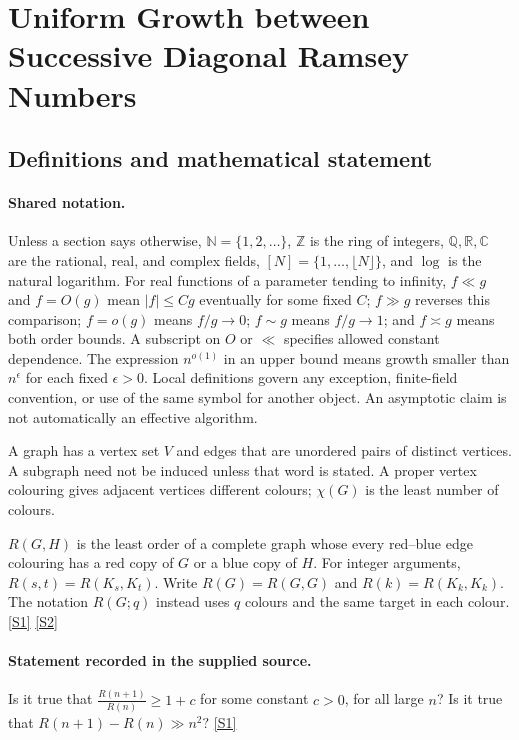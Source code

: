 \documentclass[11pt,a4paper]{article}
\newcommand{\N}{\mathbb{N}}
\newcommand{\Z}{\mathbb{Z}}
\newcommand{\Q}{\mathbb{Q}}
\newcommand{\R}{\mathbb{R}}
\newcommand{\C}{\mathbb{C}}
\newcommand{\sref}[2]{\hyperlink{source:#1:#2}{[S#2]}}
\begin{document}
\section{Uniform Growth between Successive Diagonal Ramsey Numbers}\label{statement}


\subsection{Definitions and mathematical statement}

\paragraph{Shared notation.}Unless a section says otherwise, $\N=\{1,2,\ldots\}$,
$\Z$ is the ring of integers, $\Q,\R,\C$ are the rational, real, and complex
fields, $[N]=\{1,\ldots,\lfloor N\rfloor\}$, and $\log$ is the natural
logarithm. For real functions of a parameter tending to infinity,
$f\ll g$ and $f=O(g)$ mean $|f|\leq Cg$ eventually for some fixed $C$;
$f\gg g$ reverses this comparison; $f=o(g)$ means $f/g\to0$;
$f\sim g$ means $f/g\to1$; and $f\asymp g$ means both order bounds.
A subscript on $O$ or $\ll$ specifies allowed constant dependence.
The expression $n^{o(1)}$ in an upper bound means growth smaller than
$n^\epsilon$ for each fixed $\epsilon>0$. Local definitions govern any
exception, finite-field convention, or use of the same symbol for another
object. An asymptotic claim is not automatically an effective algorithm.



A graph has a vertex set $V$ and edges that are unordered pairs of distinct vertices. A subgraph need not be induced unless that word is stated. A proper vertex colouring gives adjacent vertices different colours; $\chi(G)$ is the least number of colours.

$R(G,H)$ is the least order of a complete graph whose every red--blue edge colouring has a red copy of $G$ or a blue copy of $H$. For integer arguments, $R(s,t)=R(K_s,K_t)$. Write $R(G)=R(G,G)$ and $R(k)=R(K_k,K_k)$. The notation $R(G;q)$ instead uses $q$ colours and the same target in each colour. \sref{statement}{1} \sref{statement}{2}

\paragraph{Statement recorded in the supplied source.}
Is it true that $ \frac{R(n+1)}{R(n)}\geq 1+c $ for some constant $c>0$, for all large $n$? Is it true that $ R(n+1)-R(n) \gg n^2? $ \sref{statement}{1}
\end{document}

